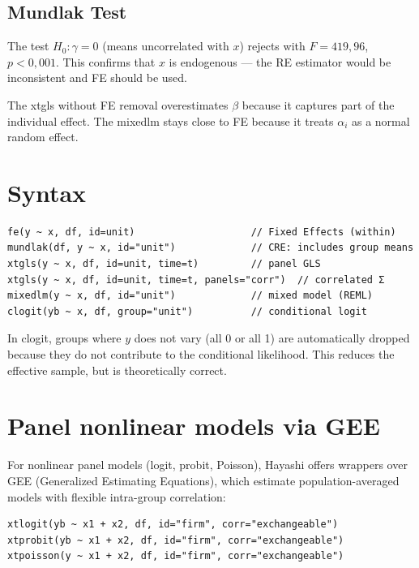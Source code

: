 \subsection*{Mundlak Test}

The test $H_0: \gamma = 0$ (means uncorrelated with $x$) rejects with
$F = 419{,}96$, $p < 0{,}001$. This confirms that $x$ is endogenous — the
RE estimator would be inconsistent and FE should be used.

The xtgls without FE removal overestimates $\beta$ because it captures part of the
individual effect. The mixedlm stays close to FE because it treats $\alpha_i$ as a
normal random effect.

\section{Syntax}

\begin{lstlisting}
fe(y ~ x, df, id=unit)                    // Fixed Effects (within)
mundlak(df, y ~ x, id="unit")             // CRE: includes group means
xtgls(y ~ x, df, id=unit, time=t)         // panel GLS
xtgls(y ~ x, df, id=unit, time=t, panels="corr")  // correlated Σ
mixedlm(y ~ x, df, id="unit")             // mixed model (REML)
clogit(yb ~ x, df, group="unit")          // conditional logit
\end{lstlisting}

\begin{nota}
  In clogit, groups where $y$ does not vary (all 0 or all 1) are
  automatically dropped because they do not contribute to the conditional
  likelihood. This reduces the effective sample, but is theoretically correct.
\end{nota}

\section{Panel nonlinear models via GEE}


For nonlinear panel models (logit, probit, Poisson), Hayashi offers
wrappers over GEE (Generalized Estimating Equations), which estimate
population-averaged models with flexible intra-group correlation:

\begin{lstlisting}
xtlogit(yb ~ x1 + x2, df, id="firm", corr="exchangeable")
xtprobit(yb ~ x1 + x2, df, id="firm", corr="exchangeable")
xtpoisson(y ~ x1 + x2, df, id="firm", corr="exchangeable")
\end{lstlisting}

